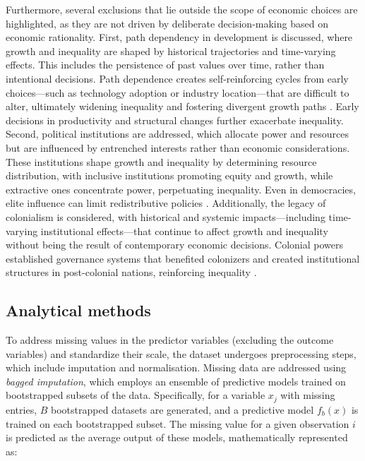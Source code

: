 Furthermore, several exclusions that lie outside the scope of economic choices are highlighted, as they are not driven by deliberate decision-making based on economic rationality. First, path dependency in development is discussed, where growth and inequality are shaped by historical trajectories and time-varying effects. This includes the persistence of past values over time, rather than intentional decisions. Path dependence creates self-reinforcing cycles from early choices—such as technology adoption or industry location—that are difficult to alter, ultimately widening inequality and fostering divergent growth paths \parencite{david1985clio, atolia2012growth, halter2014inequality}. Early decisions in productivity and structural changes further exacerbate inequality. Second, political institutions are addressed, which allocate power and resources but are influenced by entrenched interests rather than economic considerations. These institutions shape growth and inequality by determining resource distribution, with inclusive institutions promoting equity and growth, while extractive ones concentrate power, perpetuating inequality. Even in democracies, elite influence can limit redistributive policies \parencite{acemoglu2001colonial, gilens2012affluence}. Additionally, the legacy of colonialism is considered, with historical and systemic impacts—including time-varying institutional effects—that continue to affect growth and inequality without being the result of contemporary economic decisions. Colonial powers established governance systems that benefited colonizers and created institutional structures in post-colonial nations, reinforcing inequality \parencite{NBERw11057, cypher2014development}.

\subsection{Analytical methods}

To address missing values in the predictor variables (excluding the outcome variables) and standardize their scale, the dataset undergoes preprocessing steps, which include imputation and normalisation. Missing data are addressed using \textit{bagged imputation}, which employs an ensemble of predictive models trained on bootstrapped subsets of the data. Specifically, for a variable \(x_j\) with missing entries, \(B\) bootstrapped datasets are generated, and a predictive model \(f_b(x)\) is trained on each bootstrapped subset. The missing value for a given observation \(i\) is predicted as the average output of these models, mathematically represented as:

